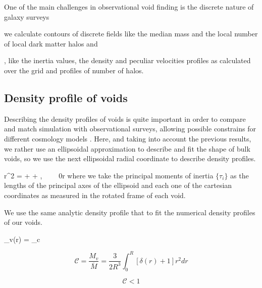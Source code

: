 \documentclass[a4,useAMS,usenatbib,usegraphicx]{latex/mn2e}
\begin{document}
One of the main challenges in observational void finding is the discrete 
nature of galaxy surveys

 we calculate contours of discrete fields like the median mass and 
the local number of local dark matter halos and

, like the inertia values,
the density and peculiar velocities profiles as calculated over the grid 
and profiles of number of halos.


\subsection{Density profile of voids}
\label{subsec:density_voids}


Describing the density profiles of voids is quite important in order to 
compare and match simulation with observational surveys, allowing possible
constrains for different cosmology models \SRKED{[Hamaous, et.al 2014]}. 
Here, and taking into account the previous results, we rather use an 
ellipsoidal approximation to describe and fit the shape of bulk voids, so 
we use the next ellipsoidal radial coordinate to describe density profiles.


{
r^2 =  +  + ,
\ \ \ \ 0\leq r 
}
where we take the principal moments of inertia $\{\tau_i \}$ as the 
lengths of the principal axes of the ellipsoid and each one of the 
cartesian coordinates as measured in the rotated frame of each void.


We use the same analytic density profile that \SRKED{[Hamaous, et.al 2014]} 
to fit the numerical density profiles of our voids.


{
\delta_v(r) = \delta_c
}


\[ \mathcal{C} = \frac{M_v}{\overline{M}} = \frac{3}{2R^{3}} \int_0^{R} [\delta(r) + 1] r^2 dr \]

\[ \mathcal{C} < 1 \]
\end{document}

